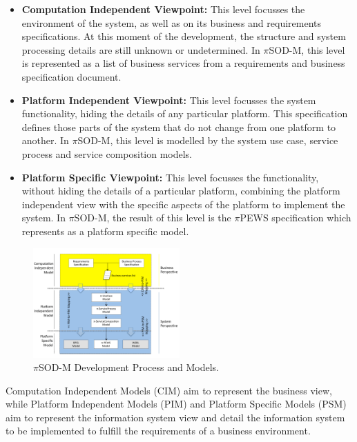 \documentclass[conference]{IEEEtran}
\begin{document}
\begin{itemize}
  \item \textbf{Computation Independent Viewpoint:} This level focusses the
  environment of the system, as well as on its business and requirements
  specifications. At this moment of the development, the structure and system
  processing details are still unknown or undetermined. In $\pi$SOD-M, this
  level is represented as a list of business services from a requirements and
  business specification document. 
  \item \textbf{Platform Independent Viewpoint:} This level focusses the system
  functionality, hiding the details of any particular platform. This
  specification defines those parts of the system that do not
  change from one platform to another. In $\pi$SOD-M, this level is modelled by the system use case, service
  process and service composition models.
  \item \textbf{Platform Specific Viewpoint:} This level focusses the
  functionality, without hiding the details of a particular platform,
  combining the platform independent view with the specific aspects of the platform to
  implement the system.  In $\pi$SOD-M, the result of this level is the
  $\pi$PEWS specification \cite{Placido2010LTPD} which represents as a platform
  specific model.
\end{itemize}

\begin{figure} [ht!]
\centering
\includegraphics[width=0.5\textwidth]{fig/PiSOD-MProcess}
\caption{$\pi$SOD-M Development Process and Models.}
\label{fig:developmentProcess}
\end{figure}


 Computation Independent Models (CIM) aim to represent the business view, while
 Platform Independent Models (PIM) and Platform Specific Models (PSM) aim
 to represent the information system view and detail the information system to
 be implemented to fulfill the requirements of a business environment.
\end{document}
